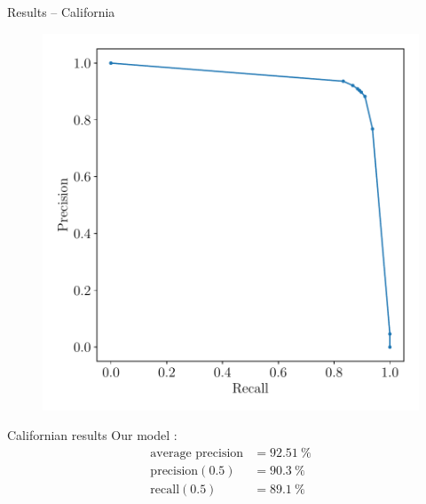 \documentclass[12pt]{beamer}
\begin{document}
\begin{frame}{Results -- California}
    \begin{figure}
        \centering
        \includegraphics[height=0.8\textheight]{resources/pdf/precision_recall.pdf}
        \vspace{-1em}
    \end{figure}
\end{frame}

\begin{frame}{Californian results}
    Our model :
    \begin{align*}
        \text{average precision} & = \SI{92.51}{\percent} \\
        \text{precision}(0.5) & = \SI{90.3}{\percent} \\
        \text{recall}(0.5) & = \SI{89.1}{\percent}
    \end{align*}
    
\end{frame}
\end{document}
